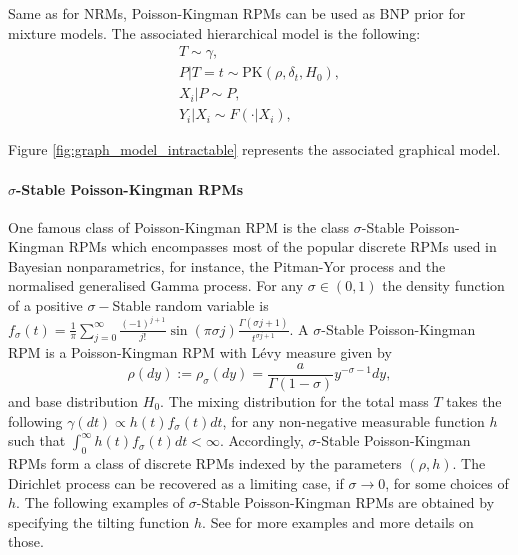 Same as for \glspl{NRM}, Poisson-Kingman \glspl{RPM} can be used as \gls{BNP} prior for mixture models. The associated hierarchical model is the following:
\begin{gather*}
T \sim \gamma, \\
P|T=t \sim \text{PK}(\rho, \delta_t, H_0), \\
X_i|P \sim P, \\
Y_i|X_i \sim F(\cdot|X_i),
\end{gather*}

Figure \ref{fig:graph_model_intractable} represents the associated graphical model.

\paragraph{$\sigma$-Stable Poisson-Kingman \glspl{RPM}}
One famous class of Poisson-Kingman \gls{RPM} is the class $\sigma$-Stable Poisson-Kingman \glspl{RPM} which encompasses most of the popular discrete \glspl{RPM} used in Bayesian nonparametrics, for instance, the Pitman-Yor process and the normalised generalised Gamma process.
For any $\sigma \in (0,1)$ the density function of a positive  $\sigma-$Stable random variable is
$f_\sigma(t) = \frac{1}{\pi}\sum_{j=0}^\infty \frac{(-1)^{j+1}}{j!}\sin(\pi\sigma j)\frac{\Gamma(\sigma j+1)}{t^{\sigma j+1}}$. A $\sigma$-Stable Poisson-Kingman \gls{RPM} is a Poisson-Kingman \gls{RPM} with Lévy measure given by
\begin{equation} \label{eq:sigma_stable_PK}
\rho(dy) := \rho_\sigma(dy) = \frac{a}{\Gamma(1 - \sigma)}y^{-\sigma-1} dy,
\end{equation}
and base distribution $H_0$.
The mixing distribution for the total mass $T$ takes the following 
$\gamma(dt) \propto h(t) f_\sigma(t) dt$, for any non-negative measurable function $h$ such that
$\int_0^\infty{h(t)f_\sigma(t) dt} < \infty$.
Accordingly, $\sigma$-Stable Poisson-Kingman \glspl{RPM} form a class of discrete \glspl{RPM} indexed by the parameters $(\rho, h)$. The Dirichlet process can be recovered as a limiting case, if $\sigma \rightarrow 0$, for some choices of $h$. The following examples of $\sigma$-Stable Poisson-Kingman \glspl{RPM}  are obtained by specifying the tilting function $h$. See \cite{LomeliThesis} for more examples and more details on those.


